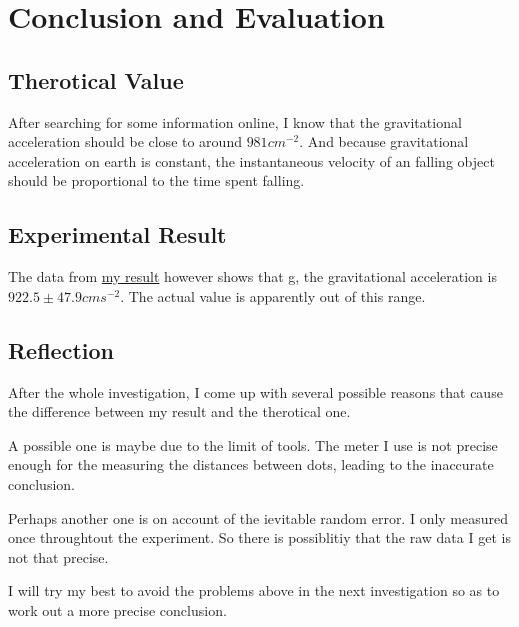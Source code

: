 \documentclass[12pt,a4paper]{article}
\begin{document}
\section{Conclusion and Evaluation}
\subsection{Therotical Value}
After searching for some information online, I know that the gravitational acceleration 
should be close to around $981cm^{-2}$. And because gravitational acceleration on earth 
is constant, the instantaneous velocity of an falling object should be proportional to
the time spent falling.
\subsection{Experimental Result}
The data from \hyperlink{my result}{my result} however shows that g, the gravitational 
acceleration is $922.5\pm 47.9cms^{-2}$. The actual value is apparently out of this
range.
\subsection{Reflection}
After the whole investigation, I come up with several possible reasons that cause the 
difference between my result and the therotical one.\par
A possible one is maybe due to the limit of tools. The meter I use is not
precise enough for the measuring the distances between dots, leading to the
inaccurate conclusion.\par
Perhaps another one is on account of the ievitable random error. I only measured once
throughtout the experiment. So there is possiblitiy that the raw data I get is not that
precise.\par
I will try my best to avoid the problems above in the next investigation so as to
work out a more precise conclusion.
\end{document}
